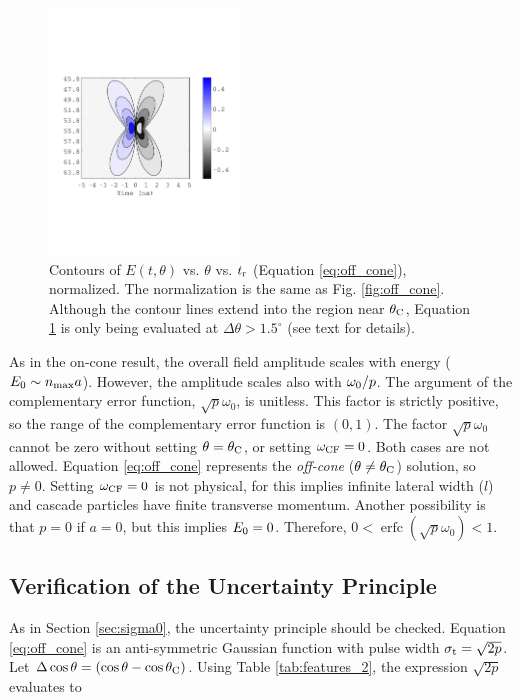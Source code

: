 \documentclass[amsmath,amssymb,aps,prd,10pt,twocolumn]{revtex4}
\DeclareMathOperator\erfc{erfc}
\begin{document}
\begin{figure}
\centering
\includegraphics[width=0.45\textwidth,trim=0cm 6cm 0cm 6cm,clip=true]{May5_plot3.pdf}
\caption{\label{fig:off_cone2} Contours of $E(t,\theta)$ vs. $\theta$ vs. $t_{\rm r}$ (Equation \ref{eq:off_cone}), normalized.  The normalization is the same as Fig. \ref{fig:off_cone}.  Although the contour lines extend into the region near $\theta_{\rm C}$, Equation \ref{fig:off_cone2} is only being evaluated at $\Delta \theta > 1.5^{\circ}$ (see text for details).}
\end{figure}

As in the on-cone result, the overall field amplitude scales with energy ($E_{\rm 0} \sim n_{\rm max} a$).  However, the amplitude scales also with $\omega_{\rm 0}/p$.  The argument of the complementary error function, $\sqrt{p}\omega_0$, is unitless.  This factor is strictly positive, so the range of the complementary error function is $(0,1)$.  The factor $\sqrt{p}\omega_0$ cannot be zero without setting $\theta = \theta_{\rm C}$, or setting $\omega_{\rm CF} = 0$.  Both cases are not allowed.  Equation \ref{eq:off_cone} represents the \textit{off-cone} ($\theta \neq \theta_{\rm C}$) solution, so $p \neq 0$.  Setting $\omega_{\rm CF} = 0$ is not physical, for this implies infinite lateral width ($l$) and cascade particles have finite transverse momentum.  Another possibility is that $p = 0$ if $a = 0$, but this implies $E_{\rm 0}=0$.  Therefore, $0 < \erfc(\sqrt{p}\omega_0) < 1$.

\subsection{Verification of the Uncertainty Principle}
\label{sec:sigma}

As in Section \ref{sec:sigma0}, the uncertainty principle should be checked.  Equation \ref{eq:off_cone} is an anti-symmetric Gaussian function with pulse width $\sigma_{\rm t} = \sqrt{2p}$.  Let $\Delta\cos\theta = (\cos\theta - \cos\theta_{\rm C})$.  Using Table \ref{tab:features_2}, the expression $\sqrt{2p}$ evaluates to
\end{document}
